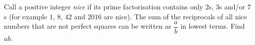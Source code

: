 Call a positive integer \emph{nice} if its prime factorisation contains only $2$s, $3$s and/or $7$s (for example $1$, $8$, $42$ and $2016$ are nice). The sum of the reciprocals of all nice numbers that are not perfect squares can be written as $\dfrac {a}{b}$ in lowest terms. Find $ab$.
